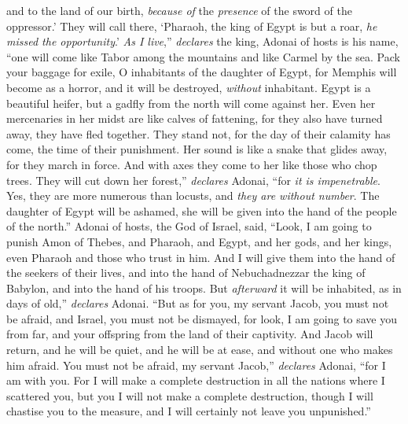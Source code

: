 \begin{biblechapter}
and to the land of our birth, 
\textit{because of} the \textit{presence} of the sword of the oppressor.’
\verse They will call there, 
‘Pharaoh, the king of Egypt is but a roar, 
\textit{he missed the opportunity}.’
\verse \textit{As I live},” \textit{declares} the king, 
Adonai of hosts is his name, 
“one will come like Tabor among the mountains 
and like Carmel by the sea.
\verse Pack your baggage for exile, 
O inhabitants of the daughter of Egypt, 
for Memphis will become as a horror, 
and it will be destroyed, \textit{without} inhabitant.
\verse Egypt is a beautiful heifer, 
but a gadfly from the north will come against her.
\verse Even her mercenaries in her midst are like calves of fattening, 
for they also have turned away, 
they have fled together. 
They stand not, 
for the day of their calamity has come, 
the time of their punishment.
\verse Her sound is like a snake that glides away, 
for they march in force. 
And with axes they come to her 
like those who chop trees.
\verse They will cut down her forest,” \textit{declares} Adonai, 
“for \textit{it is impenetrable}. 
Yes, they are more numerous than locusts, 
and \textit{they are without number}.
\verse The daughter of Egypt will be ashamed, 
she will be given into the hand of the people of the north.”
\verse Adonai of hosts, the God of Israel, said, “Look, I am going to punish Amon of Thebes, and Pharaoh, and Egypt, and her gods, and her kings, even Pharaoh and those who trust in him.
\verse And I will give them into the hand of the seekers of their lives, and into the hand of Nebuchadnezzar the king of Babylon, and into the hand of his troops. But \textit{afterward} it will be inhabited, as in days of old,” \textit{declares} Adonai.
\verse “But as for you, my servant Jacob, you must not be afraid, 
and Israel, you must not be dismayed, 
for look, I am going to save you from far, 
and your offspring from the land of their captivity. 
And Jacob will return, 
and he will be quiet, 
and he will be at ease, 
and without one who makes him afraid.
\verse You must not be afraid, my servant Jacob,” \textit{declares} Adonai, 
“for I am with you. 
For I will make a complete destruction in all the nations where I scattered you, 
but you I will not make a complete destruction, 
though I will chastise you to the measure, 
and I will certainly not leave you unpunished.”
\end{biblechapter}

